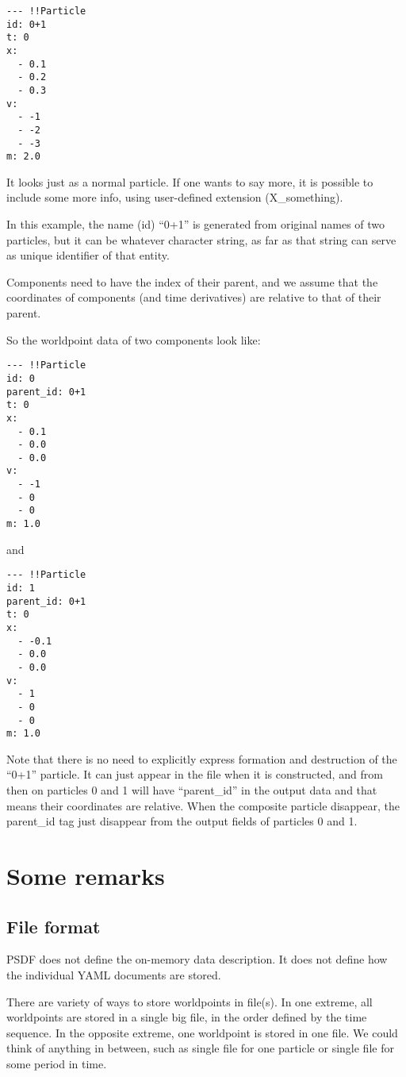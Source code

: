 \documentclass[12pt]{article}
\begin{document}
\begin{verbatim}
--- !!Particle
id: 0+1
t: 0
x:
  - 0.1
  - 0.2
  - 0.3
v:
  - -1
  - -2
  - -3
m: 2.0
\end{verbatim}

It looks just as a normal particle. If one wants to say more, it is
possible to include some more info, using user-defined extension
(X\_something).

In this example, the name (id) ``0+1'' is generated from original names of
two particles, but it can be whatever character string, as far as that
string can serve as unique identifier of that entity. 

Components need to have the index of their parent, and we assume that
the coordinates of components (and time derivatives) are relative to
that of their parent.

So the worldpoint data of two components look like:

\begin{verbatim}
--- !!Particle
id: 0
parent_id: 0+1
t: 0
x:
  - 0.1
  - 0.0
  - 0.0
v:
  - -1
  - 0
  - 0
m: 1.0
\end{verbatim}

and

\begin{verbatim}
--- !!Particle
id: 1
parent_id: 0+1
t: 0
x:
  - -0.1
  - 0.0
  - 0.0
v:
  - 1
  - 0
  - 0
m: 1.0
\end{verbatim}


Note that there is no need to explicitly express formation and
destruction of the  ``0+1'' particle. It can just appear in the file
when it is constructed, and from then on particles 0 and 1 will have
``parent\_id'' in the output data and that means their coordinates are
relative. When the composite particle disappear, the parent\_id tag
just disappear from the output fields of particles 0 and 1.


\section{Some remarks}

\subsection{File format}
PSDF does not define the on-memory data description. It does not
define how the individual YAML documents are stored.

There are variety of ways to store worldpoints in file(s). In one
extreme, all worldpoints are stored in a single big file, in the order
defined by the time sequence. In the opposite extreme, one worldpoint is
stored in one file. We could think of anything in between, such as
single file for one particle or single file for some period in time.
\end{document}
